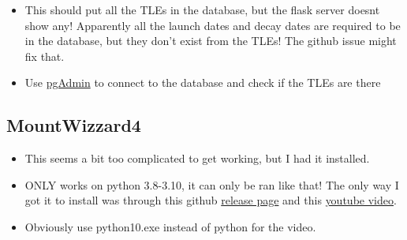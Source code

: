 \documentclass[../main.tex]{subfiles}
\begin{document}
\begin{itemize}
\begin{enumerate}
        \item In one terminal instance (I was using powershell) run \verb|$env:PYTHONPATH = "C:\...Yourpath...\satchecker\src"|
        \item Then run \verb|flask run| 
    \end{enumerate}
    \item This should put all the TLEs in the database, but the flask server doesnt show any! Apparently all the launch dates and decay dates are required to be in the database, but they don't exist from the TLEs! The github issue might fix that.
    \item Use \href{https://www.pgadmin.org/}{pgAdmin} to connect to the database and check if the TLEs are there
\end{itemize}
\subsection{MountWizzard4}
\begin{itemize}
    \item This seems a bit too complicated to get working, but I had it installed.
    \item ONLY works on python 3.8-3.10, it can only be ran like that! The only way I got it to install was through this github \href{https://github.com/mworion/InstallerMW4/releases}{release page} and this \href{https://www.youtube.com/watch?v=Tzob8ZSnMH0}{youtube video}.
    \item Obviously use python10.exe instead of python for the video.
    \end{itemize}
\end{document}
